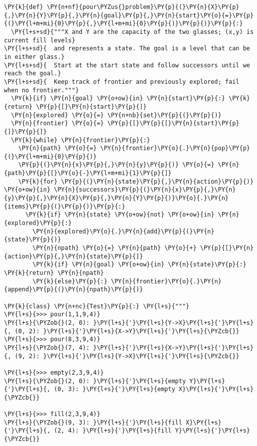 \begin{Verbatim}[commandchars=\\\{\}]
\PY{k}{def} \PY{n+nf}{pour\PYZus{}problem}\PY{p}{(}\PY{n}{X}\PY{p}{,}\PY{n}{Y}\PY{p}{,}\PY{n}{goal}\PY{p}{,}\PY{n}{start}\PY{o}{=}\PY{p}{(}\PY{l+m+mi}{0}\PY{p}{,}\PY{l+m+mi}{0}\PY{p}{)}\PY{p}{)}\PY{p}{:}
  \PY{l+s+sd}{"""X and Y are the capacity of the two glasses; (x,y) is current fill levels}
\PY{l+s+sd}{  and represents a state. The goal is a level that can be in either glass.}
\PY{l+s+sd}{  Start at the start state and follow successors until we reach the goal.}
\PY{l+s+sd}{  Keep track of frontier and previously explored; fail when no frontier."""}
  \PY{k}{if} \PY{n}{goal} \PY{o+ow}{in} \PY{n}{start}\PY{p}{:} \PY{k}{return} \PY{p}{[}\PY{n}{start}\PY{p}{]}
  \PY{n}{explored} \PY{o}{=} \PY{n+nb}{set}\PY{p}{(}\PY{p}{)}
  \PY{n}{frontier} \PY{o}{=} \PY{p}{[}\PY{p}{[}\PY{n}{start}\PY{p}{]}\PY{p}{]}
  \PY{k}{while} \PY{n}{frontier}\PY{p}{:}
    \PY{n}{path} \PY{o}{=} \PY{n}{frontier}\PY{o}{.}\PY{n}{pop}\PY{p}{(}\PY{l+m+mi}{0}\PY{p}{)}
    \PY{p}{(}\PY{n}{x}\PY{p}{,}\PY{n}{y}\PY{p}{)} \PY{o}{=} \PY{n}{path}\PY{p}{[}\PY{o}{-}\PY{l+m+mi}{1}\PY{p}{]}
    \PY{k}{for} \PY{p}{(}\PY{n}{state}\PY{p}{,}\PY{n}{action}\PY{p}{)} \PY{o+ow}{in} \PY{n}{successors}\PY{p}{(}\PY{n}{x}\PY{p}{,}\PY{n}{y}\PY{p}{,}\PY{n}{X}\PY{p}{,}\PY{n}{Y}\PY{p}{)}\PY{o}{.}\PY{n}{items}\PY{p}{(}\PY{p}{)}\PY{p}{:}
      \PY{k}{if} \PY{n}{state} \PY{o+ow}{not} \PY{o+ow}{in} \PY{n}{explored}\PY{p}{:}
        \PY{n}{explored}\PY{o}{.}\PY{n}{add}\PY{p}{(}\PY{n}{state}\PY{p}{)}
        \PY{n}{npath} \PY{o}{=} \PY{n}{path} \PY{o}{+} \PY{p}{[}\PY{n}{action}\PY{p}{,}\PY{n}{state}\PY{p}{]} 
        \PY{k}{if} \PY{n}{goal} \PY{o+ow}{in} \PY{n}{state}\PY{p}{:} \PY{k}{return} \PY{n}{npath}
        \PY{k}{else}\PY{p}{:} \PY{n}{frontier}\PY{o}{.}\PY{n}{append}\PY{p}{(}\PY{n}{npath}\PY{p}{)}

\PY{k}{class} \PY{n+nc}{Test}\PY{p}{:} \PY{l+s}{"""}
\PY{l+s}{>>> pour(1,1,9,4)}
\PY{l+s}{\PYZob{}(2, 0): }\PY{l+s}{'}\PY{l+s}{Y->X}\PY{l+s}{'}\PY{l+s}{, (0, 2): }\PY{l+s}{'}\PY{l+s}{X->Y}\PY{l+s}{'}\PY{l+s}{\PYZcb{}}
\PY{l+s}{>>> pour(8,3,9,4)}
\PY{l+s}{\PYZob{}(7, 4): }\PY{l+s}{'}\PY{l+s}{X->Y}\PY{l+s}{'}\PY{l+s}{, (9, 2): }\PY{l+s}{'}\PY{l+s}{Y->X}\PY{l+s}{'}\PY{l+s}{\PYZcb{}}

\PY{l+s}{>>> empty(2,3,9,4)}
\PY{l+s}{\PYZob{}(2, 0): }\PY{l+s}{'}\PY{l+s}{empty Y}\PY{l+s}{'}\PY{l+s}{, (0, 3): }\PY{l+s}{'}\PY{l+s}{empty X}\PY{l+s}{'}\PY{l+s}{\PYZcb{}}

\PY{l+s}{>>> fill(2,3,9,4)}
\PY{l+s}{\PYZob{}(9, 3): }\PY{l+s}{'}\PY{l+s}{fill X}\PY{l+s}{'}\PY{l+s}{, (2, 4): }\PY{l+s}{'}\PY{l+s}{fill Y}\PY{l+s}{'}\PY{l+s}{\PYZcb{}}


\end{Verbatim}
